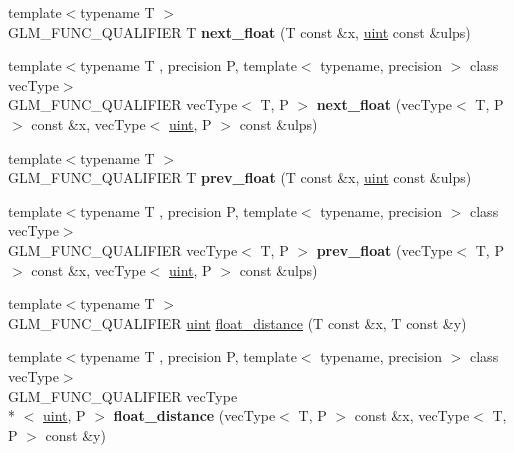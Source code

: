 \begin{DoxyCompactItemize}
\item 
\hypertarget{namespaceglm_ae4ffae05b7502be722f522c04f7e42ac}{{\footnotesize template$<$typename T $>$ }\\G\-L\-M\-\_\-\-F\-U\-N\-C\-\_\-\-Q\-U\-A\-L\-I\-F\-I\-E\-R T {\bfseries next\-\_\-float} (T const \&x, \hyperlink{group__core__precision_ga4fd29415871152bfb5abd588334147c8}{uint} const \&ulps)}\label{namespaceglm_ae4ffae05b7502be722f522c04f7e42ac}

\item 
\hypertarget{namespaceglm_a3ad10c60be0fa0e754c8064ca13c4b91}{{\footnotesize template$<$typename T , precision P, template$<$ typename, precision $>$ class vec\-Type$>$ }\\G\-L\-M\-\_\-\-F\-U\-N\-C\-\_\-\-Q\-U\-A\-L\-I\-F\-I\-E\-R vec\-Type$<$ T, P $>$ {\bfseries next\-\_\-float} (vec\-Type$<$ T, P $>$ const \&x, vec\-Type$<$ \hyperlink{group__core__precision_ga4fd29415871152bfb5abd588334147c8}{uint}, P $>$ const \&ulps)}\label{namespaceglm_a3ad10c60be0fa0e754c8064ca13c4b91}

\item 
\hypertarget{namespaceglm_a87ac8f75510274e112fe8512cfaa6935}{{\footnotesize template$<$typename T $>$ }\\G\-L\-M\-\_\-\-F\-U\-N\-C\-\_\-\-Q\-U\-A\-L\-I\-F\-I\-E\-R T {\bfseries prev\-\_\-float} (T const \&x, \hyperlink{group__core__precision_ga4fd29415871152bfb5abd588334147c8}{uint} const \&ulps)}\label{namespaceglm_a87ac8f75510274e112fe8512cfaa6935}

\item 
\hypertarget{namespaceglm_a742d4d85c23906178d1fd0c9fbab266c}{{\footnotesize template$<$typename T , precision P, template$<$ typename, precision $>$ class vec\-Type$>$ }\\G\-L\-M\-\_\-\-F\-U\-N\-C\-\_\-\-Q\-U\-A\-L\-I\-F\-I\-E\-R vec\-Type$<$ T, P $>$ {\bfseries prev\-\_\-float} (vec\-Type$<$ T, P $>$ const \&x, vec\-Type$<$ \hyperlink{group__core__precision_ga4fd29415871152bfb5abd588334147c8}{uint}, P $>$ const \&ulps)}\label{namespaceglm_a742d4d85c23906178d1fd0c9fbab266c}

\item 
{\footnotesize template$<$typename T $>$ }\\G\-L\-M\-\_\-\-F\-U\-N\-C\-\_\-\-Q\-U\-A\-L\-I\-F\-I\-E\-R \hyperlink{group__core__precision_ga4fd29415871152bfb5abd588334147c8}{uint} \hyperlink{group__gtc__ulp_ga2e09bd6c8b0a9c91f6f5683d68245634}{float\-\_\-distance} (T const \&x, T const \&y)
\item 
\hypertarget{namespaceglm_a2e00104097b2f3967e97131933595309}{{\footnotesize template$<$typename T , precision P, template$<$ typename, precision $>$ class vec\-Type$>$ }\\G\-L\-M\-\_\-\-F\-U\-N\-C\-\_\-\-Q\-U\-A\-L\-I\-F\-I\-E\-R vec\-Type\\*
$<$ \hyperlink{group__core__precision_ga4fd29415871152bfb5abd588334147c8}{uint}, P $>$ {\bfseries float\-\_\-distance} (vec\-Type$<$ T, P $>$ const \&x, vec\-Type$<$ T, P $>$ const \&y)}\label{namespaceglm_a2e00104097b2f3967e97131933595309}


\end{DoxyCompactItemize}
